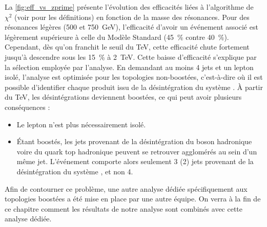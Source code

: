 La \cref{fig:eff_vs_zprime} présente l'évolution des efficacités liées à l'algorithme de $\chi^2$ (voir  pour les définitions) en fonction de la masse des résonances. Pour des résonances légères (\num{500} et \SI{750}{\GeV}), l'efficacité d'avoir un événement associé est légèrement supérieure à celle du Modèle Standard (\tilde\SI{45}{\%} contre \tilde\SI{40}{\%}). Cependant, dès qu'on franchit le seuil du \si{\TeV}, cette efficacité chute fortement jusqu'à descendre sous les \SI{15}{\%} à \SI{2}{\TeV}. Cette baisse d'efficacité s'explique par la sélection employée par l'analyse. En demandant au moins 4 jets et un lepton isolé, l'analyse est optimisée pour les topologies non-boostées, c'est-à-dire où il est possible d'identifier chaque produit issu de la désintégration du système \ttbar. À partir du \si{\TeV}, les désintégrations deviennent boostées, ce qui peut avoir plusieurs conséquences :
\begin{itemize}
  \item Le lepton n'est plus nécessairement isolé.
  \item Étant boostés, les jets provenant de la désintégration du boson \PW hadronique voire du quark top hadronique peuvent se retrouver agglomérés au sein d'un même jet. L'événement comporte alors seulement 3 (2) jets provenant de la désintégration du système \ttbar, et non 4.
\end{itemize}
Afin de contourner ce problème, une autre analyse dédiée spécifiquement aux topologies boostées a été mise en place par une autre équipe. On verra à la fin de ce chapitre comment les résultats de notre analyse sont combinés avec cette analyse dédiée.

\medskip

